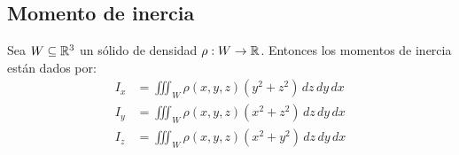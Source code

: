 \subsection{Momento de inercia}

Sea $ W \subseteq \mathbb{R}^3 $ un s\'olido de densidad $ \rho : W \to \mathbb{R}
$. Entonces los momentos de inercia est\'an dados por:
\begin{align*}
I_x &= \iiint_W \rho (x,y,z) (y^2 + z^2) \,dz\,dy\,dx \\
I_y &= \iiint_W \rho (x,y,z) (x^2 + z^2) \,dz\,dy\,dx \\
I_z &= \iiint_W \rho (x,y,z) (x^2 + y^2) \,dz\,dy\,dx
\end{align*}



